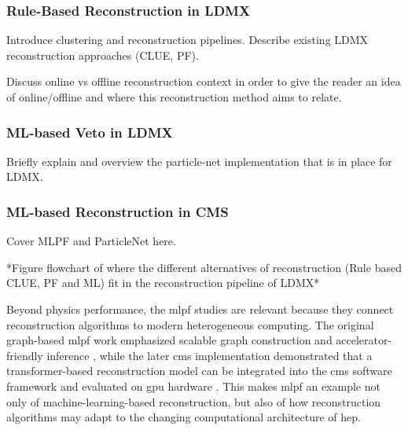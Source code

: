 \subsubsection{Rule-Based Reconstruction in LDMX}

Introduce clustering and reconstruction pipelines. Describe existing LDMX reconstruction approaches (CLUE, PF).

Discuss online vs offline reconstruction context in order to give the reader an idea of online/offline and where this reconstruction method aims to relate.

\subsubsection{ML-based Veto in LDMX}

Briefly explain and overview the particle-net implementation that is in place for LDMX. 



\subsubsection{ML-based Reconstruction in CMS}

Cover MLPF and ParticleNet here. 

*Figure flowchart of where the different alternatives of reconstruction (Rule based CLUE, PF and ML) fit in the reconstruction pipeline of LDMX*


Beyond physics performance, the \gls{mlpf} studies are relevant because they connect reconstruction algorithms to modern heterogeneous computing. The original graph-based \gls{mlpf} work emphasized scalable graph construction and accelerator-friendly inference \cite{pata2021-mlpf}, while the later \gls{cms} implementation demonstrated that a transformer-based reconstruction model can be integrated into the \gls{cms} software framework and evaluated on \gls{gpu} hardware \cite{pata2026-mlpf}. This makes \gls{mlpf} an example not only of machine-learning-based reconstruction, but also of how reconstruction algorithms may adapt to the changing computational architecture of \gls{hep}.

